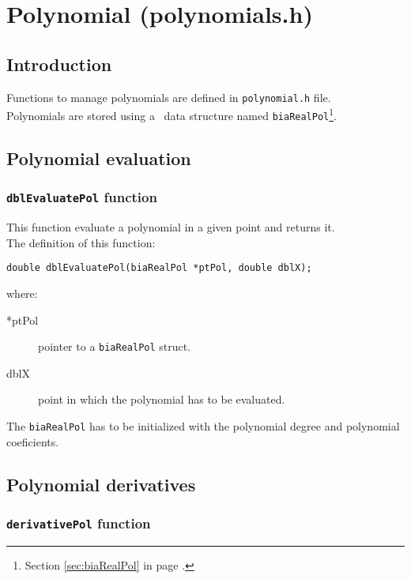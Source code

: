 %
%

\chapter{Polynomial (polynomials.h)} \label{sec:polynomial}

\section{Introduction}

Functions to manage polynomials are defined in \texttt{polynomial.h} file.\\

Polynomials are stored using a \BI\ data structure named \texttt{biaRealPol}\footnote{Section \ref{sec:biaRealPol} in page \pageref{sec:biaRealPol}.}.

\section{Polynomial evaluation}

\subsection{\texttt{dblEvaluatePol} function}

This function evaluate a polynomial in a given point and returns it.\\

The definition of this function:
%
\begin{verbatim}
double dblEvaluatePol(biaRealPol *ptPol, double dblX);  
\end{verbatim}
%
where:
\begin{description} 
\item[*ptPol] pointer to a \texttt{biaRealPol} struct.
\item[dblX] point in which the polynomial has to be evaluated.
\end{description}
%
The \texttt{biaRealPol} has to be initialized with the polynomial degree and polynomial coeficients.


\section{Polynomial derivatives}

\subsection{\texttt{derivativePol} function}

